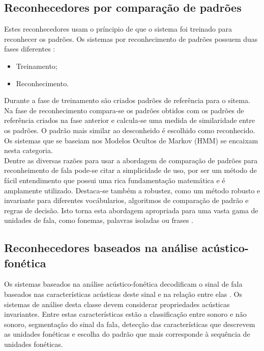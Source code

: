 \subsection{Reconhecedores por comparação de padrões}

Estes reconhecedores usam o príncipio de que o sistema foi treinado para reconhecer os padrões. Os sistemas por reconhecimento de padrões possuem duas fases diferentes :
\begin{itemize}
\item Treinamento;
\item Reconhecimento.
\end{itemize}

Durante a fase de treinamento são criados padrões de referência para o sitema. Na fase de reconhecimento compara-se os padrões obtidos com os padrões de referência criados na fase anterior e calcula-se uma medida de similaridade entre os padrões. O padrão mais similar ao desconheido é escolhido como reconhecido. Os sistemas que se baseiam nos Modelos Ocultos de Markov (HMM) se encaixam nesta categoria.\\

Dentre as diversas razões para usar a abordagem de comparação de padrões para reconheimento de fala pode-se citar a simplicidade de uso, por ser um método de fácil entendimento que possui uma rica fundamentação matemática e é amplamente utilizado.  Destaca-se também a robustez, como um método robusto e invariante para diferentes vocábularios, algoritmos de comparação de padrão e regras de decisão. Isto torna esta abordagem apropriada para uma vasta gama de unidades de fala, como fonemas, palavras isoladas ou frases  \cite{fundRecFala}. 

\subsection{Reconhecedores baseados na análise acústico-fonética}

Os sistemas baseados na análise acústico-fonética decodificam o sinal de fala  baseados nas características acústicas deste sinal e na relação entre elas \cite{kluwer}. Os sistemas de análise desta classe devem considerar propriedades acústicas invariantes. Entre estas características estão a classificação entre sonoro e não sonoro, segmentação do sinal da fala, detecção das características que descrevem as unidades fonéticas e escolha do padrão que mais corresponde à sequência de unidades fonéticas.\\

